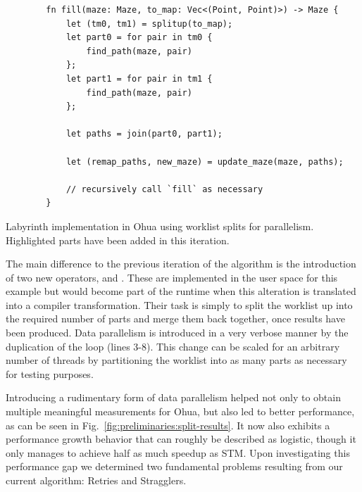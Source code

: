 \begin{listing}[t]
    \begin{verbatim}
        fn fill(maze: Maze, to_map: Vec<(Point, Point)>) -> Maze {
            let (tm0, tm1) = splitup(to_map);
            let part0 = for pair in tm0 {
                find_path(maze, pair)
            };
            let part1 = for pair in tm1 {
                find_path(maze, pair)
            };

            let paths = join(part0, part1);

            let (remap_paths, new_maze) = update_maze(maze, paths);

            // recursively call `fill` as necessary
        }
    \end{verbatim}
    \caption{Labyrinth implementation in Ohua using worklist splits for parallelism. Highlighted parts have been added in this iteration.}%
    \label{fig:preliminaries:ohua2}
\end{listing}

The main difference to the previous iteration of the algorithm is the introduction of two new operators,  and .
These are implemented in the user space for this example but would become part of the runtime when this alteration is translated into a compiler transformation.
Their task is simply to split the worklist up into the required number of parts and merge them back together, once results have been produced.
Data parallelism is introduced in a very verbose manner by the duplication of the loop (lines 3-8).
This change can be scaled for an arbitrary number of threads by partitioning the worklist into as many parts as necessary for testing purposes.

Introducing a rudimentary form of data parallelism helped not only to obtain multiple meaningful measurements for Ohua, but also led to better performance, as can be seen in Fig.~\ref{fig:preliminaries:split-results}.
It now also exhibits a performance growth behavior that can roughly be described as logistic, though it only manages to achieve half as much speedup as STM.
Upon investigating this performance gap we determined two fundamental problems resulting from our current algorithm: Retries and Stragglers.

